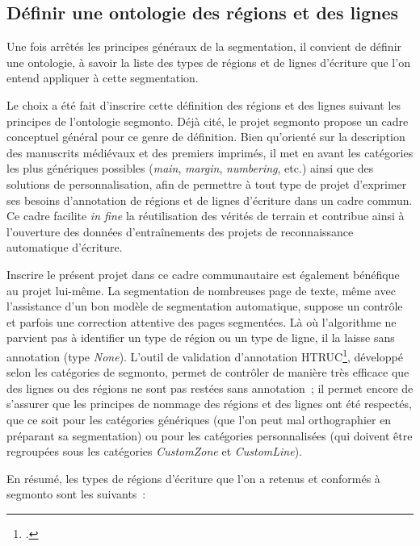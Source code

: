 \documentclass[a4paper,12pt,twoside]{book}
\begin{document}
			\subsection{Définir une ontologie des régions et des lignes}
				Une fois arrêtés les principes généraux de la {segmentation}, il convient de définir une ontologie, à savoir la liste des types de régions et de lignes d'écriture que l'on entend appliquer à cette {segmentation}.
				
				Le choix a été fait d'inscrire cette définition des régions et des lignes suivant les principes de l'ontologie \gls{segmonto}. Déjà cité, le projet \gls{segmonto} propose un cadre conceptuel général pour ce genre de définition. Bien qu'orienté sur la description des manuscrits médiévaux et des premiers imprimés, il met en avant les catégories les plus génériques possibles (\textit{main}, \textit{margin}, \textit{numbering}, etc.) ainsi que des solutions de personnalisation, afin de permettre à tout type de projet d'exprimer ses besoins d'annotation de régions et de lignes d'écriture dans un cadre commun. Ce cadre facilite \textit{in fine} la réutilisation des vérités de terrain et contribue ainsi à l'ouverture des données d'entraînements des projets de reconnaissance automatique d'écriture.
				
				Inscrire le présent projet dans ce cadre communautaire est également bénéfique au projet lui-même. La {segmentation} de nombreuses page de texte, même avec l'assistance d'un bon modèle de {segmentation} automatique, suppose un contrôle et parfois une correction attentive des pages segmentées. Là où l'algorithme ne parvient pas à identifier un type de région ou un type de ligne, il la laisse sans annotation (type \textit{None}). L'outil de validation d'annotation HTRUC\footcite{clericeHTRUCHTRUnitedCatalog2021}, développé selon les catégories de \gls{segmonto}, permet de contrôler de manière très efficace que des lignes ou des régions ne sont pas restées sans annotation~; il permet encore de s'assurer que les principes de nommage des régions et des lignes ont été respectés, que ce soit pour les catégories génériques (que l'on peut mal orthographier en préparant sa {segmentation}) ou pour les catégories personnalisées (qui doivent être regroupées sous les catégories \textit{CustomZone} et \textit{CustomLine}).
				
				En résumé, les types de régions d'écriture que l'on a retenus et conformés à \gls{segmonto} sont les suivants~:
				
\end{document}
